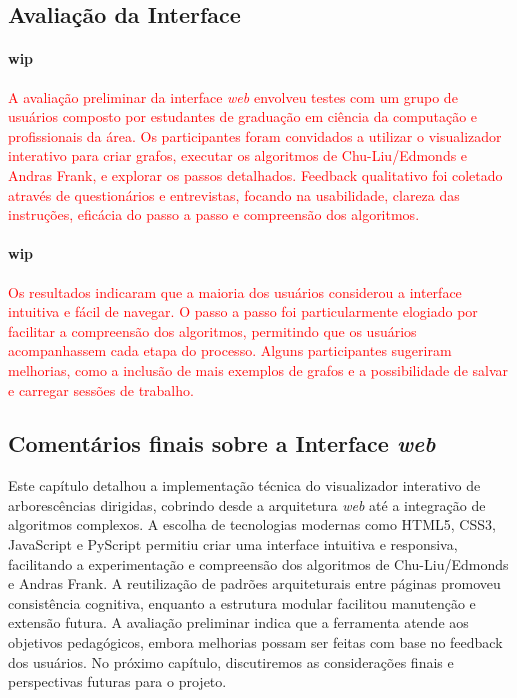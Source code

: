 \documentclass[12pt,a4paper]{article}
\begin{document}
\subsection{Avaliação da Interface}
\paragraph{wip}
\textcolor{red}{A avaliação preliminar da interface \textit{web} envolveu testes com um grupo de usuários composto por estudantes de graduação em ciência da computação e profissionais da área. Os participantes foram convidados a utilizar o visualizador interativo para criar grafos, executar os algoritmos de Chu-Liu/Edmonds e Andras Frank, e explorar os passos detalhados. Feedback qualitativo foi coletado através de questionários e entrevistas, focando na usabilidade, clareza das instruções, eficácia do passo a passo e compreensão dos algoritmos.}

\paragraph{wip}
\textcolor{red}{Os resultados indicaram que a maioria dos usuários considerou a interface intuitiva e fácil de navegar. O passo a passo foi particularmente elogiado por facilitar a compreensão dos algoritmos, permitindo que os usuários acompanhassem cada etapa do processo. Alguns participantes sugeriram melhorias, como a inclusão de mais exemplos de grafos e a possibilidade de salvar e carregar sessões de trabalho.}

\subsection{Comentários finais sobre a Interface \textit{web}}
Este capítulo detalhou a implementação técnica do visualizador interativo de arborescências dirigidas, cobrindo desde a arquitetura \textit{web} até a integração de algoritmos complexos. A escolha de tecnologias modernas como HTML5, CSS3, JavaScript e PyScript permitiu criar uma interface intuitiva e responsiva, facilitando a experimentação e compreensão dos algoritmos de Chu-Liu/Edmonds e Andras Frank. A reutilização de padrões arquiteturais entre páginas promoveu consistência cognitiva, enquanto a estrutura modular facilitou manutenção e extensão futura. A avaliação preliminar indica que a ferramenta atende aos objetivos pedagógicos, embora melhorias possam ser feitas com base no feedback dos usuários. No próximo capítulo, discutiremos as considerações finais e perspectivas futuras para o projeto.
\end{document}
